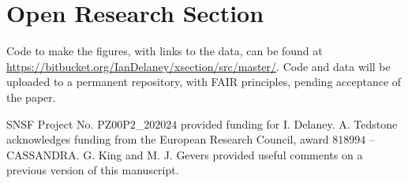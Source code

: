 \documentclass[draft]{agujournal2019}
\begin{document}
\section*{Open Research Section}

Code to make the figures, with links to the data, can be found at \url{https://bitbucket.org/IanDelaney/xsection/src/master/}.
Code and data will be uploaded to a permanent repository, with FAIR principles, pending acceptance of the paper.

\acknowledgments

SNSF Project No. $\mathrm{PZ00P2}$\_$202024$ provided  funding for I. Delaney.
A. Tedstone acknowledges funding from the European Research Council, award $818994$ -- CASSANDRA.
G. King and M. J. Gevers provided useful comments on a previous version of this manuscript.



\newpage

\appendix
\end{document}
